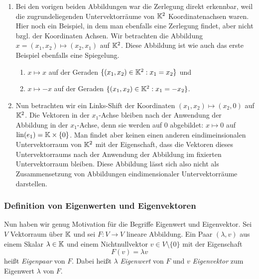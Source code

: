 \begin{enumerate}
	\item Bei den vorigen beiden Abbildungen war die Zerlegung direkt erkennbar, weil die zugrundeliegenden Untervektorräume von $\mathbb K^2$ Koordinatenachsen waren. Hier noch ein Beispiel, in dem man ebenfalls eine Zerlegung findet, aber nicht bzgl. der Koordinaten Achsen. 
		Wir betrachten die Abbildung $ x = (x_1,x_2) \mapsto (x_2,x_1) $ auf $ \mathbb K^2 $. Diese Abbildung ist wie auch das erste Beispiel ebenfalls eine Spiegelung.
		\begin{enumerate}
			\item $ x \mapsto x $ auf der Geraden $ \{ (x_1,x_2) \in \mathbb K^2 : x_1 = x_2 \} $ und
			\item $ x \mapsto -x $ auf der Geraden $ \{ (x_1,x_2) \in \mathbb K^2 : x_1 = - x_2 \} $.
		\end{enumerate}
			\begin{center}
	\end{center}

	\item
		Nun betrachten wir ein Links-Shift der Koordinaten $ (x_1,x_2) \mapsto (x_2,0) $ auf $ \mathbb K^2 $.
		Die Vektoren in der $x_1$-Achse bleiben nach der Anwendung der Abbildung in der $x_1$-Achse, denn sie werden auf $0$ abgebildet: 
		$ x \mapsto 0 $ auf $ \operatorname{lin}(e_1) = \mathbb K \times \{ 0 \} $. 
		Man findet aber keinen einen anderen eindimeinsionalen Untervektorraum von $\mathbb K^2$ mit der Eigenschaft, dass die Vektoren dieses Untervektorraums nach der Anwendung der Abbildung im fixierten Untervektorraum bleiben. 
		Diese Abbildung lässt sich also nicht als Zusammensetzung von Abbildungen eindimensionaler Untervektorräume darstellen. 
\end{enumerate}

\subsubsection{Definition von Eigenwerten und Eigenvektoren}

Nun haben wir genug Motivation für die Begriffe Eigenwert und Eigenvektor. 
Sei $ V $ Vektorraum über $ \mathbb K $ und sei $ F : V \to V $ lineare Abbildung. Ein Paar $(\lambda,v)$ aus einem Skalar $\lambda \in \mathbb K$  und einem Nichtnullvektor $ v \in V \setminus \{ 0 \} $ mit der Eigenschaft
\begin{equation}
	F(v) = \lambda v
\end{equation}
heißt \emph{Eigenpaar} von $F$. Dabei heißt $\lambda$ \emph{Eigenwert} von $F$ und $v$ \emph{Eigenvektor} zum Eigenwert $\lambda$ von $F$. 

